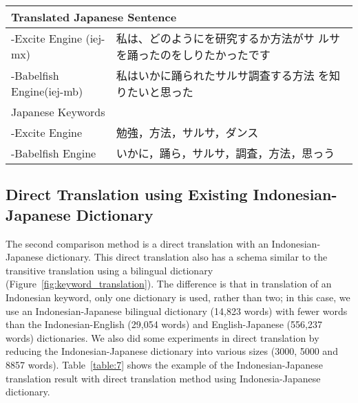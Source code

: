 \documentclass[english]{jnlp_1.3c}
\begin{document}
\begin{table}[t]
\begin{center}
\begin{tabular}{|l|l|}
    \multicolumn{2}{|l|}{Translated Japanese Sentence} \\ \hline
    \multicolumn{1}{|p{10em}|}{-Excite Engine (iej-mx)}
    &    \multicolumn{1}{|p{30em}|}{私は、どのようにを研究するか方法がサ
    ルサを踊ったのをしりたかったです}   \\  \hline
     \multicolumn{1}{|p{8em}|}{-Babelfish Engine(iej-mb)}
    &    \multicolumn{1}{|p{30em}|}{私はいかに踊られたサルサ調査する方法
    を知りたいと思った}   \\  \hline
     \multicolumn{2}{|l|}{Japanese Keywords} \\ \hline
     \multicolumn{1}{|p{10em}|}{-Excite Engine}
    &    \multicolumn{1}{|p{30em}|}{勉強，方法，サルサ，ダンス}   \\  \hline
     \multicolumn{1}{|p{10em}|}{-Babelfish Engine}
    &    \multicolumn{1}{|p{30em}|}{いかに，踊ら，サルサ，調査，方法，思っう}   \\  \hline
   \end{tabular}
  \end{center}
\end{table}


\subsection{Direct Translation using Existing Indonesian-Japanese Dictionary}
\label{Direct Translation using Existing Indonesian-Japanese Dictionary}
The second comparison method is a direct translation with an
Indonesian-Japanese dictionary. This direct translation also has a
schema similar to the transitive translation using a bilingual
dictionary (Figure~\ref{fig:keyword_translation}). The difference is
that in translation of an Indonesian keyword, only one dictionary is
used, rather than two; in this case, we use an Indonesian-Japanese
bilingual dictionary (14,823 words) with fewer words than the
Indonesian-English (29,054 words) and English-Japanese (556,237 words)
dictionaries. We also did some experiments in direct translation by
reducing the Indonesian-Japanese dictionary into various sizes (3000,
5000 and 8857 words). Table~\ref{table:7} shows the example of the
Indonesian-Japanese translation result with direct translation method
using Indonesia-Japanese dictionary.
\end{document}
